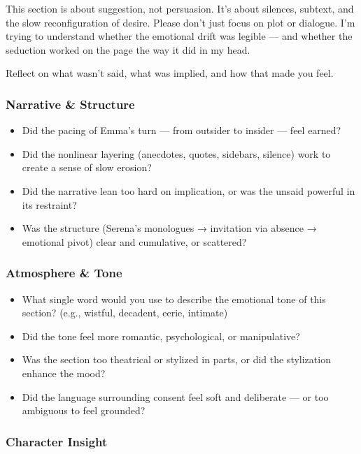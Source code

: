 This section is about suggestion, not persuasion. It’s about silences, subtext, and the slow reconfiguration of desire.
Please don’t just focus on plot or dialogue. I’m trying to understand whether the emotional drift was legible — and whether the seduction worked on the page the way it did in my head.

Reflect on what wasn’t said, what was implied, and how that made you feel.

\subsubsection{Narrative \& Structure}

\begin{itemize}
\item Did the pacing of Emma’s turn — from outsider to insider — feel earned?
\item Did the nonlinear layering (anecdotes, quotes, sidebars, silence) work to create a sense of slow erosion?
\item Did the narrative lean too hard on implication, or was the unsaid powerful in its restraint?
\item Was the structure (Serena's monologues → invitation via absence → emotional pivot) clear and cumulative, or scattered?
\end{itemize}

\subsubsection{Atmosphere \& Tone}

\begin{itemize}
\item What single word would you use to describe the emotional tone of this section? (e.g., wistful, decadent, eerie, intimate)
\item Did the tone feel more romantic, psychological, or manipulative?
\item Was the section too theatrical or stylized in parts, or did the stylization enhance the mood?
\item Did the language surrounding consent feel soft and deliberate — or too ambiguous to feel grounded?
\end{itemize}

\subsubsection{Character Insight}

